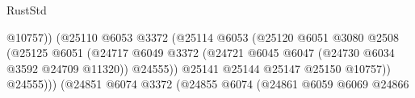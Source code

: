 \begin{lexlean}{RustStd}
\begin{coremodule}
                                                          @10757))
                                                      (@25110
                                                        @6053
                                                        @3372
                                                        (@25114
                                                          @6053
                                                          (@25120
                                                            @6051
                                                            @3080
                                                            @2508
                                                            (@25125
                                                              @6051
                                                              (@24717
                                                                @6049
                                                                @3372
                                                                (@24721
                                                                  @6045
                                                                  @6047
                                                                  (@24730
                                                                    @6034
                                                                    @3592
                                                                    @24709
                                                                    @11320))
                                                                @24555))
                                                            @25141
                                                            @25144
                                                            @25147
                                                            @25150
                                                            @10757))
                                                        @24555)))
                                                  (@24851
                                                    @6074
                                                    @3372
                                                    (@24855
                                                      @6074
                                                      (@24861
                                                        @6059
                                                        @6069
                                                        @24866

\end{coremodule}
\end{lexlean}
